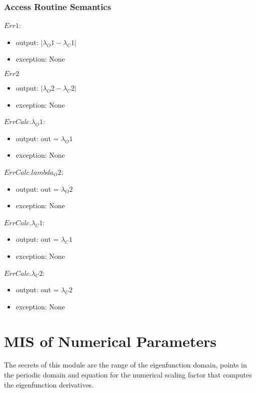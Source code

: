 \documentclass[12pt, titlepage]{article}
\begin{document}
\subsubsection{Access Routine Semantics}


$Err1$:
\begin{itemize}
	\item output: $| \lambda_O1 - \lambda_C1| $ 
	\item exception: None
\end{itemize}


\noindent $Err2$
\begin{itemize} 
	\item output: $| \lambda_O2 - \lambda_C2| $ 
	\item exception: None
\end{itemize} 

\noindent $ErrCalc.\lambda_O1$:
\begin{itemize}
	\item output: out = $\lambda_O1$
	\item exception: None 
\end{itemize}

\noindent $ErrCalc.lambda_O2$:
\begin{itemize}
	\item output: out = $\lambda_O2$
	\item exception: None
\end{itemize}

\noindent $ErrCalc.\lambda_C1$:
\begin{itemize}
	\item output: out = $\lambda_C1$
	\item exception: None
\end{itemize}

\noindent $ErrCalc.\lambda_C2$:
\begin{itemize}
	\item output: out = $\lambda_C2$ 
	\item exception: None
\end{itemize}

\newpage 

\section{MIS of Numerical Parameters} 

The secrets of this module are the range of the eigenfunction domain, points in 
the 
periodic domain and equation for the numerical scaling factor that computes 
the 
eigenfunction derivatives. 
\end{document}
